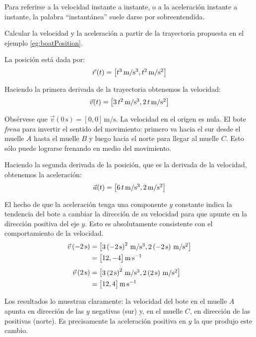 Para referirse a la velocidad instante a instante, o a la aceleración instante a instante, la palabra ``instantánea'' suele darse por sobreentendida.

\begin{mdframed}[style=ExampleFrame]
    \begin{example}
    \end{example}
    \begin{formatI}
        Calcular la velocidad y la aceleración a partir de la trayectoria propuesta en el ejemplo \ref{eg:boatPosition}.
    \end{formatI}
    La posición está dada por:
    \begin{equation*}
        \vec{r}\hspace{0.05cm}(t) = { \begin{bmatrix} t^3\,\si{\metre\per\second^3}, t^2\,\si{\metre\per\second^2} \end{bmatrix} }
    \end{equation*}

    Haciendo la primera derivada de la trayectoria obtenemos la velocidad:
    \[ \Vec{v}(t) = { \begin{bmatrix} 3\,t^2\,\si{\metre\per\second^3}, 2\,t\,\si{\metre\per\second^2} \end{bmatrix} } \]

    Obsérvese que $\Vec{v}(0\,\si{\second}) = [0, 0]\,\si{\metre\per\second}$.
    La velocidad en el origen es nula.
    El bote \emph{frena} para invertir el sentido del movimiento: primero va hacia el sur desde el muelle $A$ hasta el muelle $B$ y luego hacia el norte para llegar al muelle $C$.
    Esto sólo puede lograrse frenando en medio del movimiento.

    Haciendo la segunda derivada de la posición, que es la derivada de la velocidad, obtenemos la aceleración:
    \[ \Vec{a}(t) = { \begin{bmatrix} 6\,t\,\si{\metre\per\second^3}, 2\,\si{\metre\per\second^2} \end{bmatrix} } \]

    El hecho de que la aceleración tenga una componente $y$ constante indica la tendencia del bote a cambiar la dirección de su velocidad para que apunte en la dirección positiva del eje $y$.
    Esto es absolutamente consistente con el comportamiento de la velocidad.
    \begin{align*}
        \Vec{v} \left(-2\,\si{\second}\right)
        &= { \begin{bmatrix} 3 \left(-2\,\si{\second}\right)^2\,\si{\metre\per\second^3}, 2\left(-2\,\si{\second}\right)\,\si{\metre\per\second^2} \end{bmatrix} }
        \\
        &= { \begin{bmatrix} 12, -4 \end{bmatrix} }\,\si{\metre\per\second}
        \\[1ex]
        \Vec{v} \left(2\,\si{\second}\right)
        &= { \begin{bmatrix} 3 \left(2\,\si{\second}\right)^2\,\si{\metre\per\second^3}, 2 \left(2\,\si{\second}\right)\,\si{\metre\per\second^2} \end{bmatrix} }
        \\
        &= { \begin{bmatrix} 12, 4 \end{bmatrix} }\,\si{\metre\per\second}
    \end{align*}

    Los resultados lo muestran claramente: la velocidad del bote en el muelle $A$ apunta en dirección de las $y$ negativas (sur) y, en el muelle $C$, en dirección de las positivas (norte).
    Es precisamente la aceleración positiva en $y$ la que produjo este cambio.
\end{mdframed}


